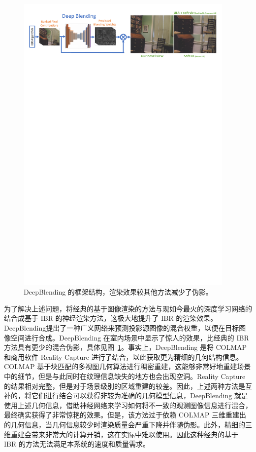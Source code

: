 \begin{figure}[tbhp]
    \centering
    \includegraphics[width=0.95\textwidth]{figures/deepblending.pdf}
    \caption{DeepBlending\cite{hedman2018deep} 的框架结构，渲染效果较其他方法减少了伪影。}
    \label{fig:deepblending}
\end{figure}

为了解决上述问题，将经典的基于图像渲染的方法与现如今最火的深度学习网络的结合成基于 IBR 的神经渲染方法，这极大地提升了 IBR 的渲染效果。DeepBlending\cite{hedman2018deep}提出了一种广义网络来预测投影源图像的混合权重，以便在目标图像空间进行合成。DeepBlending 在室内场景中显示了惊人的效果，比经典的 IBR 方法具有更少的混合伪影，具体见图~\ref{fig:deepblending}。事实上，DeepBlending 是将 COLMAP\cite{schonberger2016structure} 和商用软件 Reality Capture 进行了结合，以此获取更为精细的几何结构信息。COLMAP 基于块匹配的多视图几何算法进行稠密重建，这能够非常好地重建场景中的细节，但是与此同时在纹理信息缺失的地方也会出现空洞。Reality Capture 的结果相对完整，但是对于场景级别的区域重建的较差。因此，上述两种方法是互补的，将它们进行结合可以获得非较为准确的几何模型信息，DeepBlending 就是使用上述几何信息，借助神经网络来学习如何将不一致的观测图像信息进行混合，最终确实获得了非常惊艳的效果。但是，该方法过于依赖 COLMAP 三维重建出的几何信息，当几何信息较少时渲染质量会严重下降并伴随伪影。此外，精细的三维重建会带来非常大的计算开销，这在实际中难以使用。因此这种经典的基于 IBR 的方法无法满足本系统的速度和质量需求。

